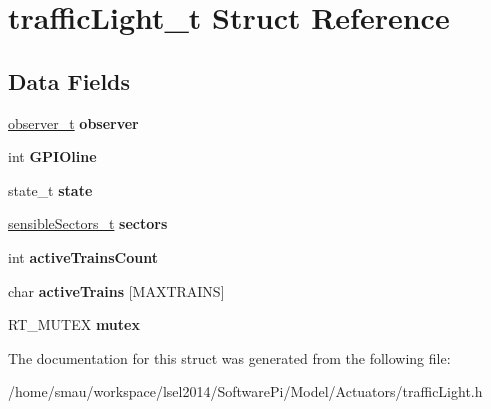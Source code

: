 \hypertarget{structtrafficLight__t}{\section{traffic\-Light\-\_\-t Struct Reference}
\label{structtrafficLight__t}
}
\subsection*{Data Fields}
\begin{DoxyCompactItemize}
\item 
\hypertarget{structtrafficLight__t_a689b5a0fca76ebd932bd7631e7e7b55e}{\hyperlink{structobserver__t}{observer\-\_\-t} {\bfseries observer}}\label{structtrafficLight__t_a689b5a0fca76ebd932bd7631e7e7b55e}

\item 
\hypertarget{structtrafficLight__t_a7f621c3fc9090f0da6b14e7ffba760c2}{int {\bfseries G\-P\-I\-Oline}}\label{structtrafficLight__t_a7f621c3fc9090f0da6b14e7ffba760c2}

\item 
\hypertarget{structtrafficLight__t_a6484de865858c64a359beacf9b985024}{state\-\_\-t {\bfseries state}}\label{structtrafficLight__t_a6484de865858c64a359beacf9b985024}

\item 
\hypertarget{structtrafficLight__t_a9f6acf3ad3fbd2ee4dc10ec147a32c2f}{\hyperlink{structsensibleSectors__t}{sensible\-Sectors\-\_\-t} {\bfseries sectors}}\label{structtrafficLight__t_a9f6acf3ad3fbd2ee4dc10ec147a32c2f}

\item 
\hypertarget{structtrafficLight__t_a7ec6ea36be7f3d06550efad4defb9d19}{int {\bfseries active\-Trains\-Count}}\label{structtrafficLight__t_a7ec6ea36be7f3d06550efad4defb9d19}

\item 
\hypertarget{structtrafficLight__t_a2f5652bb16a05a70071127eb98dcc1da}{char {\bfseries active\-Trains} \mbox{[}M\-A\-X\-T\-R\-A\-I\-N\-S\mbox{]}}\label{structtrafficLight__t_a2f5652bb16a05a70071127eb98dcc1da}

\item 
\hypertarget{structtrafficLight__t_ab41ae07fb2090182567f0e5316ce7ead}{R\-T\-\_\-\-M\-U\-T\-E\-X {\bfseries mutex}}\label{structtrafficLight__t_ab41ae07fb2090182567f0e5316ce7ead}

\end{DoxyCompactItemize}


The documentation for this struct was generated from the following file\-:\begin{DoxyCompactItemize}
\item 
/home/smau/workspace/lsel2014/\-Software\-Pi/\-Model/\-Actuators/traffic\-Light.\-h\end{DoxyCompactItemize}
